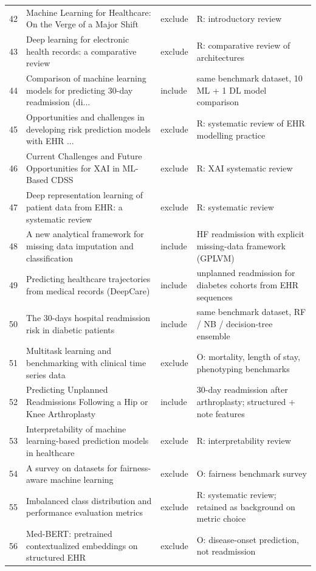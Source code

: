 \begin{longtable}{rp{4.9cm}p{1.35cm}p{4.6cm}}
42 & Machine Learning for Healthcare: On the Verge of a Major Shift & exclude & R: introductory review \\
43 & Deep learning for electronic health records: a comparative review & exclude & R: comparative review of architectures \\
44 & Comparison of machine learning models for predicting 30-day readmission (di... & include & same benchmark dataset, 10 ML + 1 DL model comparison \\
45 & Opportunities and challenges in developing risk prediction models with EHR ... & exclude & R: systematic review of EHR modelling practice \\
46 & Current Challenges and Future Opportunities for XAI in ML-Based CDSS & exclude & R: XAI systematic review \\
47 & Deep representation learning of patient data from EHR: a systematic review & exclude & R: systematic review \\
48 & A new analytical framework for missing data imputation and classification & include & HF readmission with explicit missing-data framework (GPLVM) \\
49 & Predicting healthcare trajectories from medical records (DeepCare) & include & unplanned readmission for diabetes cohorts from EHR sequences \\
50 & The 30-days hospital readmission risk in diabetic patients & include & same benchmark dataset, RF / NB / decision-tree ensemble \\
51 & Multitask learning and benchmarking with clinical time series data & exclude & O: mortality, length of stay, phenotyping benchmarks \\
52 & Predicting Unplanned Readmissions Following a Hip or Knee Arthroplasty & include & 30-day readmission after arthroplasty; structured + note features \\
53 & Interpretability of machine learning-based prediction models in healthcare & exclude & R: interpretability review \\
54 & A survey on datasets for fairness-aware machine learning & exclude & O: fairness benchmark survey \\
55 & Imbalanced class distribution and performance evaluation metrics & exclude & R: systematic review; retained as background on metric choice \\
56 & Med-BERT: pretrained contextualized embeddings on structured EHR & exclude & O: disease-onset prediction, not readmission \\

\end{longtable}
